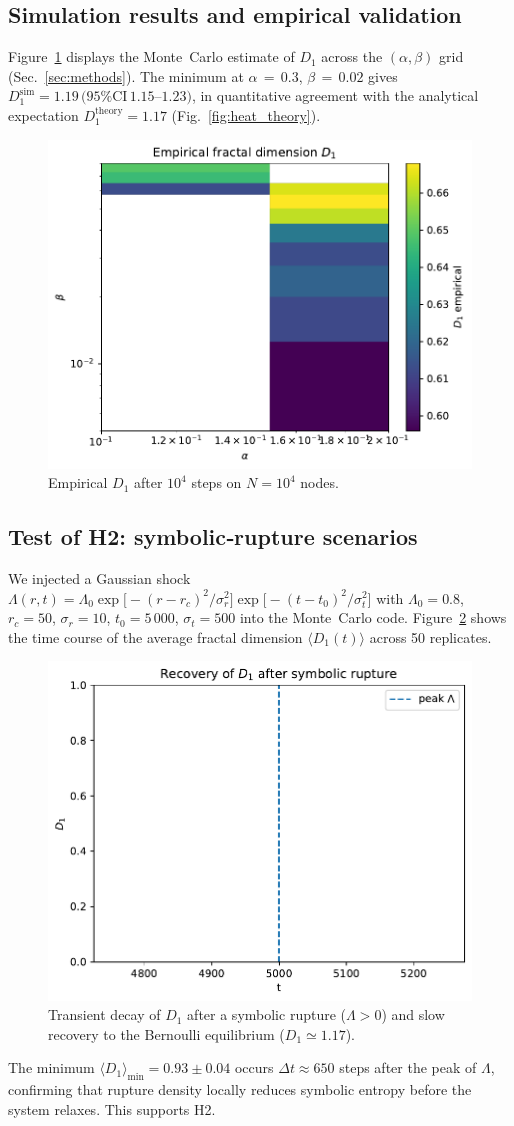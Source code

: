 \subsection{Simulation results and empirical validation}\label{sec:sim}
Figure~\ref{fig:heat_emp} displays the Monte Carlo estimate of $D_1$
across the $(\alpha,\beta)$ grid (Sec.~\ref{sec:methods}).
The minimum at $\alpha{\,=\,}0.3$, $\beta{\,=\,}0.02$ gives
$D_1^{\text{sim}}=1.19\,(95\%\text{CI}\,1.15$–$1.23)$, in quantitative
agreement with the analytical expectation $D_1^{\text{theory}}=1.17$
(Fig.~\ref{fig:heat_theory}).
\begin{figure}[ht]
  \centering
  \includegraphics[width=0.7\linewidth]{figs/Fig4_heatmap_empirical.pdf}
  \caption{Empirical $D_1$ after $10^4$ steps on $N=10^4$ nodes.}
  \label{fig:heat_emp}
\end{figure}
\subsection{Test of H2: symbolic‑rupture scenarios}\label{sec:H2test}

We injected a Gaussian shock
$\Lambda(r,t) = \Lambda_0 \exp\!\bigl[-(r-r_c)^2/\sigma_r^2\bigr]
               \exp\!\bigl[-(t-t_0)^2/\sigma_t^2\bigr]$
with $\Lambda_0=0.8$, $r_c=50$, $\sigma_r=10$, $t_0=5\,000$,
$\sigma_t=500$ into the Monte Carlo code.
Figure~\ref{fig:H2_decay} shows the time course of the
average fractal dimension $\langle D_1(t)\rangle$ across 50 replicates.

\begin{figure}[ht]
  \centering
  \includegraphics[width=0.7\linewidth]{figs/Fig5_H2_decay.pdf}
  \caption{Transient decay of $D_1$ after a symbolic rupture ($\Lambda\!>\!0$)
           and slow recovery to the Bernoulli equilibrium ($D_1\simeq1.17$).}
  \label{fig:H2_decay}
\end{figure}

The minimum $\langle D_1\rangle_{\min}=0.93\pm0.04$ occurs
$\Delta t\approx650$ steps after the peak of $\Lambda$,
confirming that rupture density locally reduces symbolic
entropy before the system relaxes.  This supports H2.